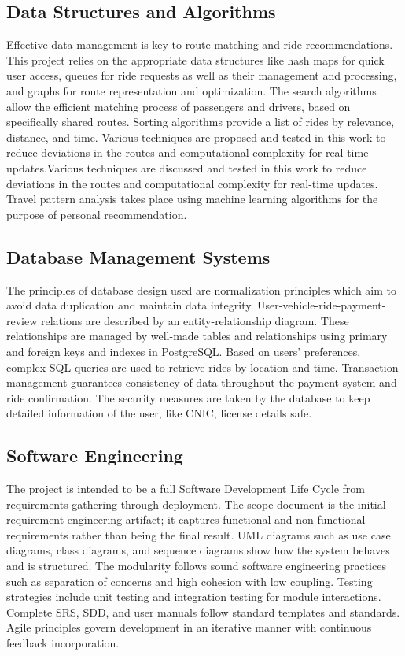 \subsection{Data Structures and Algorithms}

Effective data management is key to route matching and ride recommendations. This project relies on the appropriate data structures like hash maps for quick user access, queues for ride requests as well as their management and processing, and graphs for route representation and optimization. The search algorithms allow the efficient matching process of passengers and drivers, based on specifically shared routes. Sorting algorithms provide a list of rides by relevance, distance, and time. Various techniques are proposed and tested in this work to reduce deviations in the routes and computational complexity for real-time updates.Various techniques are discussed and tested in this work to reduce deviations in the routes and computational complexity for real-time updates. Travel pattern analysis takes place using machine learning algorithms for the purpose of personal recommendation.

\subsection{Database Management Systems}

The principles of database design used are normalization principles which aim to avoid data duplication and maintain data integrity. User-vehicle-ride-payment-review relations are described by an entity-relationship diagram. These relationships are managed by well-made tables and relationships using primary and foreign keys and indexes in PostgreSQL. Based on users' preferences, complex SQL queries are used to retrieve rides by location and time. Transaction management guarantees consistency of data throughout the payment system and ride confirmation. The security measures are taken by the database to keep detailed information of the user, like CNIC, license details safe.

\subsection{Software Engineering}

The project is intended to be a full Software Development Life Cycle from requirements gathering through deployment. The scope document is the initial requirement engineering artifact; it captures functional and non-functional requirements rather than being the final result. UML diagrams such as use case diagrams, class diagrams, and sequence diagrams show how the system behaves and is structured. The modularity follows sound software engineering practices such as separation of concerns and high cohesion with low coupling. Testing strategies include unit testing and integration testing for module interactions. Complete SRS, SDD, and user manuals follow standard templates and standards. Agile principles govern development in an iterative manner with continuous feedback incorporation.

